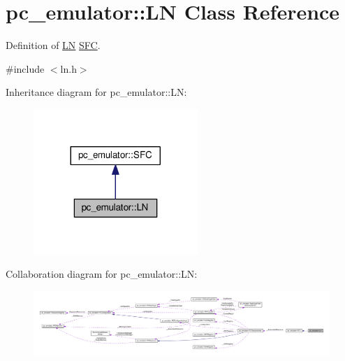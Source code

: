 \hypertarget{classpc__emulator_1_1LN}{}\section{pc\+\_\+emulator\+:\+:LN Class Reference}
\label{classpc__emulator_1_1LN}


Definition of \hyperlink{classpc__emulator_1_1LN}{LN} \hyperlink{classpc__emulator_1_1SFC}{S\+FC}.  




{\ttfamily \#include $<$ln.\+h$>$}



Inheritance diagram for pc\+\_\+emulator\+:\+:LN\+:\nopagebreak
\begin{figure}[H]
\begin{center}
\leavevmode
\includegraphics[width=176pt]{classpc__emulator_1_1LN__inherit__graph}
\end{center}
\end{figure}


Collaboration diagram for pc\+\_\+emulator\+:\+:LN\+:\nopagebreak
\begin{figure}[H]
\begin{center}
\leavevmode
\includegraphics[width=350pt]{classpc__emulator_1_1LN__coll__graph}
\end{center}
\end{figure}

